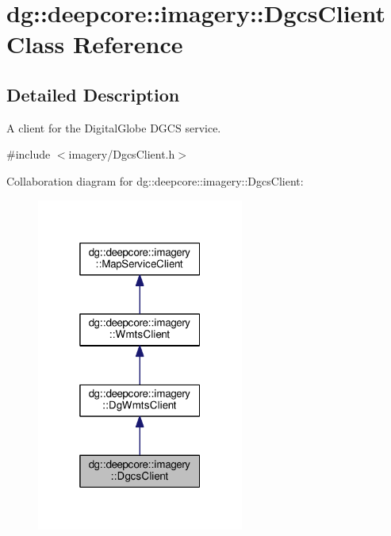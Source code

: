 \hypertarget{structdg_1_1deepcore_1_1imagery_1_1_dgcs_client}{}\section{dg\+:\+:deepcore\+:\+:imagery\+:\+:Dgcs\+Client Class Reference}
\label{structdg_1_1deepcore_1_1imagery_1_1_dgcs_client}


\subsection{Detailed Description}
A client for the Digital\+Globe D\+G\+CS service. 

{\ttfamily \#include $<$imagery/\+Dgcs\+Client.\+h$>$}



Collaboration diagram for dg\+:\+:deepcore\+:\+:imagery\+:\+:Dgcs\+Client\+:
\nopagebreak
\begin{figure}[H]
\begin{center}
\leavevmode
\includegraphics[width=193pt]{structdg_1_1deepcore_1_1imagery_1_1_dgcs_client__coll__graph}
\end{center}
\end{figure}
